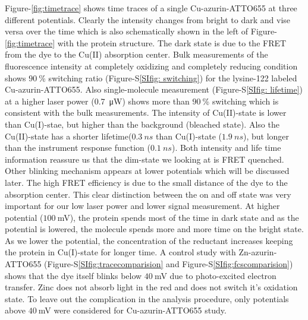 Figure-\ref{fig:timetrace} shows time traces of a single Cu-azurin-ATTO655 at three different potentials. Clearly the intensity changes from bright to dark and vise versa over the time which is also schematically shown in the left of Figure-\ref{fig:timetrace} with the protein structure. The dark state is due to the FRET from the dye to the Cu(II) absorption center\cite{kuznetsova2006a}. Bulk measurements of the fluorescence intensity at completely oxidizing and completely reducing condition shows $90~$\% switching ratio (Figure-S\ref{SIfig: switching}) for the lysine-122\cite{nicolardi2012topdown} labeled Cu-azurin-ATTO655. Also single-molecule measurement (Figure-S\ref{SIfig: lifetime}) at a higher laser power (\SI{0.7}{\micro\watt}) shows more than $90~$\% switching which is consistent with the bulk measurements. The intensity of Cu(II)-state is lower than Cu(I)-stae, but higher than the background (bleached state). Also the Cu(II)-state has a shorter lifetime($0.3~ns$ than Cu(I)-state ($1.9~ns$), but longer than the instrument response function ($0.1~ns$). Both intensity and life time information reassure us that the dim-state we looking at is FRET quenched. Other blinking mechanism appears at lower potentials which will be discussed later. The high FRET efficiency is due to the small distance of the dye to the absorption center. This clear distinction between the on and off state was very important for our low laser power and lower signal measurement. At higher potential ($100~$mV), the protein spends most of the time in dark state and as the potential is lowered, the molecule spends more and more time on the bright state. As we lower the potential, the concentration of the reductant increases keeping the protein in Cu(I)-state for longer time. A control study with Zn-azurin-ATTO655 (Figure-S\ref{SIfig:tracecomparision} and Figure-S\ref{SIfig:fcscomparision}) shows that the dye itself blinks below $40~$mV due to photo-excited electron transfer. Zinc does not absorb light in the red and does not switch it's oxidation state. To leave out the complication in the analysis procedure, only potentials above $40~$mV were considered for Cu-azurin-ATTO655 study.\\

